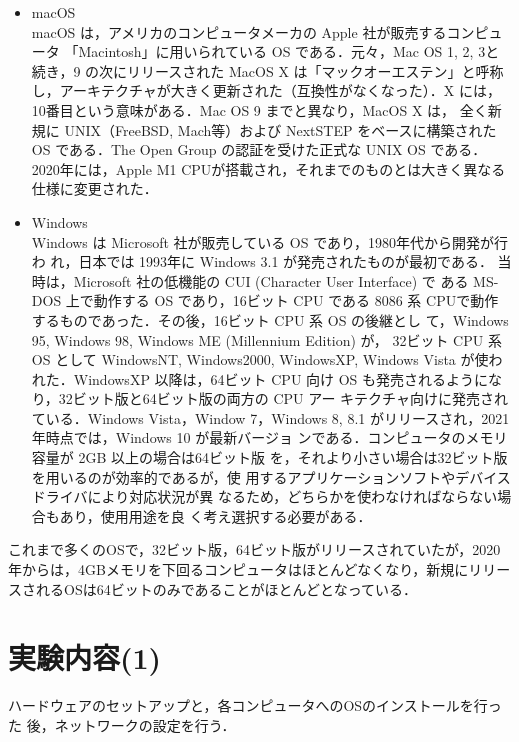 \begin{itemize}
\begin{itemize}
  \end{itemize}
  \item macOS\\
macOS は，アメリカのコンピュータメーカの Apple 社が販売するコンピュータ
	「Macintosh」に用いられている OS である．元々，Mac OS 1, 2, 3と続き，9 の次にリリースされた MacOS X は「マックオーエステン」と呼称し，アーキテクチャが大きく更新された（互換性がなくなった）．X	には，10番目という意味がある．Mac OS 9 までと異なり，MacOS X は，
	全く新規に UNIX（FreeBSD, Mach等）および NextSTEP をベースに構築された OS である．The Open Group の認証を受けた正式な	UNIX OS である．2020年には，Apple M1 CPUが搭載され，それまでのものとは大きく異なる仕様に変更された．
  \item Windows\\
Windows は Microsoft 社が販売している OS であり，1980年代から開発が行わ
	れ，日本では 1993年に Windows 3.1 が発売されたものが最初である．
	当時は，Microsoft 社の低機能の CUI (Character User Interface) で
	ある MS-DOS 上で動作する OS であり，16ビット CPU である 8086 系
	CPUで動作するものであった．その後，16ビット CPU 系 OS の後継とし
	て，Windows 95, Windows 98, Windows ME (Millennium Edition) が，
	32ビット CPU 系 OS として WindowsNT, Windows2000, WindowsXP,
	Windows Vista が使われた．WindowsXP 以降は，64ビット CPU 向け OS 
	も発売されるようになり，32ビット版と64ビット版の両方の CPU アー
	キテクチャ向けに発売されている．Windows Vista，Window 7，Windows
	8, 8.1 がリリースされ，2021年時点では，Windows 10 が最新バージョ
	ンである．コンピュータのメモリ容量が 2GB 以上の場合は64ビット版
	を，それより小さい場合は32ビット版を用いるのが効率的であるが，使
	用するアプリケーションソフトやデバイスドライバにより対応状況が異
	なるため，どちらかを使わなければならない場合もあり，使用用途を良
	く考え選択する必要がある．
\end{itemize}

これまで多くのOSで，32ビット版，64ビット版がリリースされていたが，2020年からは，4GBメモリを下回るコンピュータはほとんどなくなり，新規にリリースされるOSは64ビットのみであることがほとんどとなっている．

\section{実験内容(1)}

ハードウェアのセットアップと，各コンピュータへのOSのインストールを行った
後，ネットワークの設定を行う．

